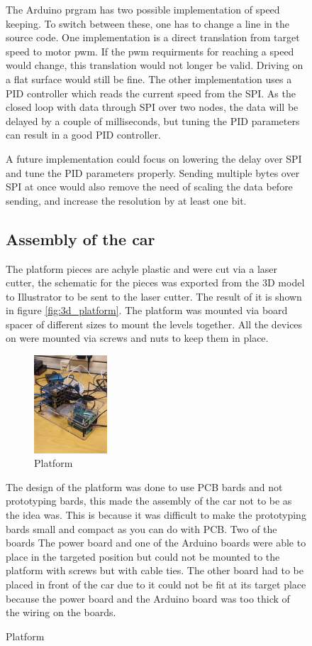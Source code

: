 \documentclass[11pt, titlepage]{article} %
\begin{document}
\begin{figure}
The Arduino prgram has two possible implementation of speed keeping. To switch between these, one has to change a line in the source code. One implementation is a direct translation from target speed to motor pwm. If the pwm requirments for reaching a speed would change, this translation would not longer be valid. Driving on a flat surface would still be fine. The other implementation uses a PID controller which reads the current speed from the SPI. As the closed loop with data through SPI over two nodes, the data will be delayed by a couple of milliseconds, but tuning the PID parameters can result in a good PID controller.

A future implementation could focus on lowering the delay over SPI and tune the PID parameters properly. Sending multiple bytes over SPI at once would also remove the need of scaling the data before sending, and increase the resolution by at least one bit.

\subsection{Assembly of the car}


The platform pieces are achyle plastic and were cut via a laser cutter, the schematic for the pieces was exported from the 3D model to Illustrator to be sent to the laser cutter. The result of it is shown in figure \ref{fig:3d_platform}. The platform was mounted via board spacer of different sizes to mount the levels together. All the devices on were mounted via screws and nuts to keep them in place. 


\begin{figure}
	\includegraphics[width=0.3\textwidth]{platform_assembely.jpg}
	\caption{Platform}
	\label{fig:platform_ass}
\end{figure}

The design of the platform was done to use PCB bards and not prototyping bards, this made the assembly of the car not to be as the idea was. This is because it was difficult to make the prototyping bards small and compact as you can do with PCB.  Two of the boards The power board and one of the Arduino boards were able to place in the targeted position but could not be mounted to the platform with screws but with cable ties. The other board had to be placed in front of the car due to it could not be fit at its target place because the power board and the Arduino board was too thick of the wiring on the boards. 
 


\end{figure}
\end{document}
